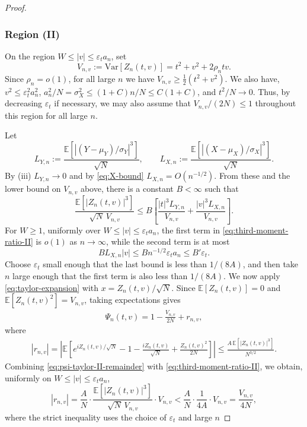 \documentclass[11pt]{article}
\numberwithin{equation}{section}
\newcommand{\Var}[1]{\mathrm{Var}\left[ #1\right]}
\newcommand{\ex}[1]{\ensuremath{\mathbb{E}\left[ #1\right]}}
\begin{document}
\begin{proof}
\subsubsection*{Region (II)}
On the region $W \le |v| \le \varepsilon_t a_n$, set
\[
V_{n,v}:= \Var{Z_n(t,v)} = t^2+v^2+2\rho_n tv.
\]
Since $\rho_n=o(1)$, for all large $n$ we have $V_{n,v} \ge \frac{1}{2}(t^2+v^2)$. We also have, 
$v^2\le \varepsilon_t^2a_n^2$, $a_n^2/N=\sigma_X^2 \le (1+C)n/N\le C(1+C)$, and $t^2/N\to0$. Thus, by decreasing $\varepsilon_t$ if necessary, we may also assume that $V_{n,v}/(2N)\le 1$ throughout this region for all large $n$. 

Let
\[
L_{Y,n}:=\frac{\ex{ |(Y-\mu_Y)/\sigma_Y|^3}}{\sqrt{N}},
\qquad
L_{X,n}:=\frac{\ex{ |(X-\mu_X)/\sigma_X|^3}}{\sqrt{N}}.
\]
By (iii) $L_{Y,n} \to 0$ and by \eqref{eq:X-bound} $L_{X,n}=O(n^{-1/2})$. From these and the lower bound on $V_{n,v}$ above, there is a constant  $B<\infty$ such that
\begin{equation}
\label{eq:third-moment-ratio-II}
\frac{\ex{ |Z_n(t,v)|^3}}{\sqrt N\,V_{n,v}}
\le B\left[ \frac{|t|^3L_{Y,n}}{V_{n,v}} +\frac{|v|^3L_{X,n}}{V_{n,v}} \right].
\end{equation}
For $W\ge 1$, uniformly over $W \le |v|\le \varepsilon_t a_n$, the first term in \eqref{eq:third-moment-ratio-II} is
$o(1)$ as $n\to\infty$, while the second term is at most
\[
B L_{X,n}|v| \le B n^{-1/2}\varepsilon_t a_n \le B'\varepsilon_t.
\]
Choose $\varepsilon_t$ small enough that the last bound is less than
$1/(8A)$, and then take $n$ large enough that the first term is also less
than $1/(8A)$. We now apply \eqref{eq:taylor-expansion} with
$x=Z_n(t,v)/\sqrt{N}$. Since $\ex{Z_n(t,v)}=0$ and
$\ex{Z_n(t,v)^2}=V_{n,v}$, taking expectations gives
\begin{align}
    \label{eq:psi-taylor-II}
\Psi_n(t,v)
=
1-\frac{V_{n,v}}{2N}+r_{n,v},
\end{align}
where
\begin{align}
    \label{eq:psi-taylor-II-remainder}
|r_{n,v}|
= \left|\ex{e^{iZ_n(t,v)/\sqrt{N}}-1-\frac{iZ_n(t,v)}{\sqrt{N}}+\frac{Z_n(t,v)^2}{2N}}\right|
\le \frac{A\,\ex{|Z_n(t,v)|^3}}{N^{3/2}}.
\end{align}
Combining \eqref{eq:psi-taylor-II-remainder} with \eqref{eq:third-moment-ratio-II}, we obtain, uniformly on $W \le |v|\le \varepsilon_t a_n$,
\[
|r_{n,v}|
= \frac{A}{N}\cdot
\frac{\ex{|Z_n(t,v)|^3}}{\sqrt{N}\,V_{n,v}}\cdot V_{n,v}
< \frac{A}{N}\cdot\frac{1}{4A}\cdot V_{n,v}
= \frac{V_{n,v}}{4N},
\]
where the strict inequality uses the choice of $\varepsilon_t$ and large $n$

\end{proof}
\end{document}
